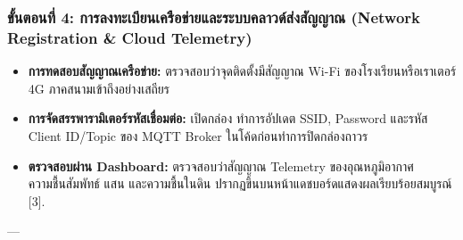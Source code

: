 \documentclass[11pt,a4paper,openany]{report}
\begin{document}
\subsubsection{ขั้นตอนที่ 4: การลงทะเบียนเครือข่ายและระบบคลาวด์ส่งสัญญาณ (Network Registration \& Cloud Telemetry)}

\begin{itemize}
  \item \textbf{การทดสอบสัญญาณเครือข่าย:} ตรวจสอบว่าจุดติดตั้งมีสัญญาณ Wi-Fi ของโรงเรียนหรือเราเตอร์ 4G ภาคสนามเข้าถึงอย่างเสถียร
  \item \textbf{การจัดสรรพารามิเตอร์รหัสเชื่อมต่อ:} เปิดกล่อง ทำการอัปเดต SSID, Password และรหัส Client ID/Topic ของ MQTT Broker ในโค้ดก่อนทำการปิดกล่องถาวร
  \item \textbf{ตรวจสอบผ่าน Dashboard:} ตรวจสอบว่าสัญญาณ Telemetry ของอุณหภูมิอากาศ ความชื้นสัมพัทธ์ แสน และความชื้นในดิน ปรากฏขึ้นบนหน้าแดชบอร์ดแสดงผลเรียบร้อยสมบูรณ์ [3].
\end{itemize}



---
\end{document}
